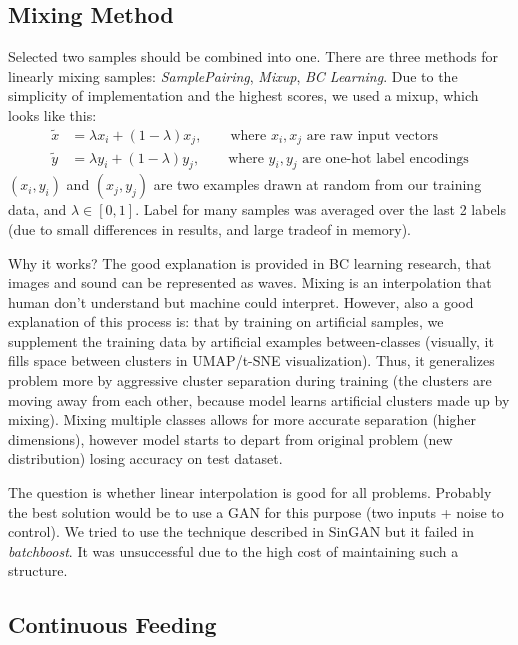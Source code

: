 \documentclass{article}
\begin{document}
\subsection{Mixing Method}
\label{sec:mixing}

Selected two samples should be combined into one.
There are three methods for linearly mixing samples: \emph{SamplePairing},
\emph{Mixup}, \emph{BC Learning}. Due to the simplicity of implementation and
the highest scores, we used a mixup, which looks like this:
\begin{align*}
  \tilde{x} &= \lambda x_i + (1 - \lambda) x_j,\qquad \text{where~} x_i, x_j \text{~are~raw~input~vectors}\\
  \tilde{y} &= \lambda y_i + (1 - \lambda) y_j,\qquad \text{where~} y_i, y_j \text{~are~one-hot~label~encodings}
\end{align*}
$(x_i, y_i)$ and $(x_j, y_j)$ are two examples drawn at random from our
training data, and $\lambda \in [0,1]$.
Label for many samples was averaged over the last 2 labels (due to small differences in results, and large tradeof in memory).

Why it works?
The good explanation is provided in BC learning research, that images and sound
can be represented as waves. Mixing is an interpolation that human don't
understand but machine could interpret.
However, also a good explanation of this process is: that by training on
artificial samples, we supplement the training data by artificial examples between-classes
(visually, it fills space between clusters in UMAP/t-SNE visualization).
Thus, it generalizes problem more by aggressive cluster separation during
training (the clusters are moving away from each other, because model learns
artificial clusters made up by mixing).
Mixing multiple classes allows for more accurate separation (higher dimensions), however model starts to depart from original problem (new distribution) losing accuracy on test dataset.

The question is whether linear interpolation is good for all problems.
Probably the best solution would be to use a GAN for this purpose (two inputs +
noise to control). We tried to use the technique described in
SinGAN\cite{shaham2019singan} but it
failed in \emph{batchboost}.  It was unsuccessful due to the high cost of
maintaining such a structure.

\subsection{Continuous Feeding}
\label{sec:feeding}
\end{document}
